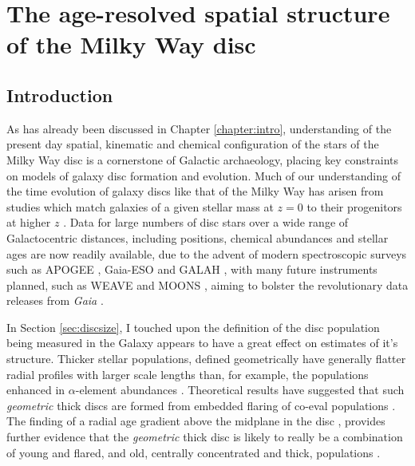 \chapter{The age-resolved spatial structure of the Milky Way disc}
\label{chapter:apogeestruc}
\section{Introduction}

As has already been discussed in Chapter \ref{chapter:intro}, understanding of the present day spatial, kinematic and chemical configuration of the stars of the Milky Way disc is a cornerstone of Galactic archaeology, placing key constraints on models of galaxy disc formation and evolution. Much of our understanding of the time evolution of galaxy discs like that of the Milky Way has arisen from studies which match galaxies of a given stellar mass at $z=0$ to their progenitors at higher $z$ \citep[and therefore, lookback time, e.g.][]{2013ApJ...771L..35V,2015ApJ...803...26P,2016MNRAS.462.4495H}. 
Data for large numbers of disc stars over a wide range of Galactocentric distances, including positions, chemical abundances and stellar ages are now readily available, due to the advent of modern spectroscopic surveys such as APOGEE \citep{2015arXiv150905420M}, Gaia-ESO \citep{2012Msngr.147...25G} and GALAH \citep{2016arXiv160902822M}, with many future instruments planned, such as WEAVE \citep{2014SPIE.9147E..0LD} and MOONS \citep{2012SPIE.8446E..0SC}, aiming to bolster the revolutionary data releases from \emph{Gaia} \citep{2016A&A...595A...1G}.

In Section \ref{sec:discsize}, I touched upon the definition of the disc population being measured in the Galaxy appears to have a great effect on estimates of it's structure. Thicker stellar populations, defined geometrically have generally flatter radial profiles with larger scale lengths \citep[e.g.][]{2008ApJ...673..864J} than, for example, the populations enhanced in $\alpha$-element abundances \citep[e.g.][]{2012ApJ...752...51C,2012ApJ...753..148B,2016ApJ...823...30B}. Theoretical results have suggested that such \emph{geometric} thick discs are formed from embedded flaring of co-eval populations  \citep{2015ApJ...804L...9M}. The finding of a radial age gradient above the midplane in the disc \citep[e.g.][]{2016arXiv160901168M}, provides further evidence that the \emph{geometric} thick disc is likely to really be a combination of young and flared, and old, centrally concentrated and thick, populations \citep[as predicted by the models of][]{2015ApJ...804L...9M}.

